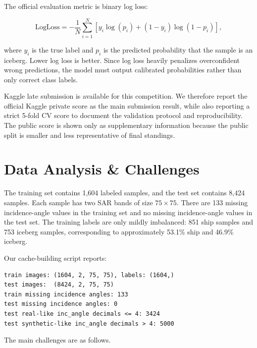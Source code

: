 \documentclass[11pt]{article}
\begin{document}
The official evaluation metric is binary log loss:

\[
\mathrm{LogLoss}=-\frac{1}{N}\sum_{i=1}^{N}\left[y_i\log(p_i)+(1-y_i)\log(1-p_i)\right],
\]

where $y_i$ is the true label and $p_i$ is the predicted probability that the sample is an iceberg. Lower log loss is better. Since log loss heavily penalizes overconfident wrong predictions, the model must output calibrated probabilities rather than only correct class labels.

Kaggle late submission is available for this competition. We therefore report the official Kaggle private score as the main submission result, while also reporting a strict 5-fold CV score to document the validation protocol and reproducibility. The public score is shown only as supplementary information because the public split is smaller and less representative of final standings.

\section{Data Analysis \& Challenges}

The training set contains 1,604 labeled samples, and the test set contains 8,424 samples. Each sample has two SAR bands of size $75 \times 75$. There are 133 missing incidence-angle values in the training set and no missing incidence-angle values in the test set. The training labels are only mildly imbalanced: 851 ship samples and 753 iceberg samples, corresponding to approximately 53.1\% ship and 46.9\% iceberg.

Our cache-building script reports:

\begin{lstlisting}
train images: (1604, 2, 75, 75), labels: (1604,)
test images:  (8424, 2, 75, 75)
train missing incidence angles: 133
test missing incidence angles: 0
test real-like inc_angle decimals <= 4: 3424
test synthetic-like inc_angle decimals > 4: 5000
\end{lstlisting}

The main challenges are as follows.
\end{document}
